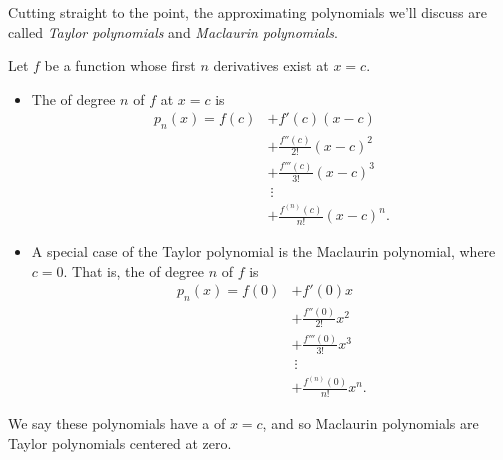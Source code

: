\documentclass{ximera}
\begin{document}
Cutting straight to the point, the approximating polynomials we'll
discuss are called \textit{Taylor polynomials} and \textit{Maclaurin
  polynomials}.

\begin{definition}
  Let $f$ be a function whose first $n$ derivatives exist at $x=c$.
  \begin{itemize}
  \item The  of degree $n$ of $f$ at $x=c$ is
    \begin{align*}
      p_n(x) = f(c) &+ f'(c)(x-c) \\
      &+ \frac{f''(c)}{2!}(x-c)^2 \\
      &+\frac{f'''(c)}{3!}(x-c)^3 \\
      &\ \vdots \\
      &+\frac{f^{(n)}(c)}{n!}(x-c)^n.
    \end{align*}
  \item A special case of the Taylor polynomial is the Maclaurin
    polynomial, where $c=0$. That is, the 
    of degree $n$ of $f$ is
    \begin{align*}
      p_n(x) = f(0) &+ f'(0)x \\
      &+\frac{f''(0)}{2!}x^2\\
      &+\frac{f'''(0)}{3!}x^3\\
      &\ \vdots\\
      &+\frac{f^{(n)}(0)}{n!}x^n.
    \end{align*}
  \end{itemize}
  We say these polynomials have a  of $x=c$, and so
  Maclaurin polynomials are Taylor polynomials centered at
  zero.
\end{definition}
\end{document}
